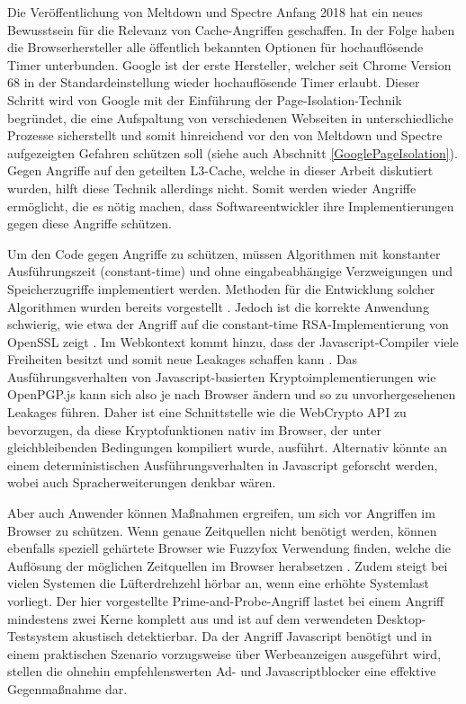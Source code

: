 Die Veröffentlichung von Meltdown und Spectre Anfang 2018 hat ein neues Bewusstsein für die Relevanz von Cache-Angriffen geschaffen.
In der Folge haben die Browserhersteller alle öffentlich bekannten Optionen für hochauflösende Timer unterbunden.
Google ist der erste Hersteller, welcher seit Chrome Version 68 in der Standardeinstellung wieder hochauflösende Timer erlaubt.
Dieser Schritt wird von Google mit der Einführung der Page-Isolation-Technik \cite{ChromeSiteIsolation} begründet, die eine Aufspaltung von verschiedenen Webseiten in unterschiedliche Prozesse sicherstellt und somit hinreichend vor den von Meltdown und Spectre aufgezeigten Gefahren schützen soll (siehe auch Abschnitt \ref{GooglePageIsolation}).
Gegen Angriffe auf den geteilten L3-Cache, welche in dieser Arbeit diskutiert wurden, hilft diese Technik allerdings nicht.
Somit werden wieder Angriffe ermöglicht, die es nötig machen, dass Softwareentwickler ihre Implementierungen gegen diese Angriffe schützen.

Um den Code gegen Angriffe zu schützen, müssen Algorithmen mit konstanter Ausführungszeit (constant-time) und ohne eingabeabhängige Verzweigungen und Speicherzugriffe implementiert werden.
Methoden für die Entwicklung solcher Algorithmen wurden bereits vorgestellt \cite{ConstTimeAlgorithm}.
Jedoch ist die korrekte Anwendung schwierig, wie etwa der Angriff auf die constant-time RSA-Implementierung von OpenSSL zeigt \cite{CacheBleed}.
Im Webkontext kommt hinzu, dass der Javascript-Compiler viele Freiheiten besitzt und somit neue Leakages schaffen kann \cite{DriveByPaper}.
Das Ausführungsverhalten von Javascript-basierten Kryptoimplementierungen wie OpenPGP.js kann sich also je nach Browser ändern und so zu unvorhergesehenen Leakages führen.
Daher ist eine Schnittstelle wie die WebCrypto API \cite{WebCryptoAPI} zu bevorzugen, da diese Kryptofunktionen nativ im Browser, der unter gleichbleibenden Bedingungen kompiliert wurde, ausführt.
Alternativ könnte an einem deterministischen Ausführungsverhalten in Javascript geforscht werden, wobei auch Spracherweiterungen denkbar wären.

Aber auch Anwender können Maßnahmen ergreifen, um sich vor Angriffen im Browser zu schützen.
Wenn genaue Zeitquellen nicht benötigt werden, können ebenfalls speziell gehärtete Browser wie Fuzzyfox \cite{Fuzzyfox} Verwendung finden, welche die Auflösung der möglichen Zeitquellen im Browser herabsetzen \cite{FantasticTimers}.
Zudem steigt bei vielen Systemen die Lüfterdrehzehl hörbar an, wenn eine erhöhte Systemlast vorliegt. 
Der hier vorgestellte Prime-and-Probe-Angriff lastet bei einem Angriff mindestens zwei Kerne komplett aus und ist auf dem verwendeten Desktop-Testsystem akustisch detektierbar.
Da der Angriff Javascript benötigt und in einem praktischen Szenario vorzugsweise über Werbeanzeigen ausgeführt wird, stellen die ohnehin empfehlenswerten Ad- und Javascriptblocker eine effektive Gegenmaßnahme dar.

